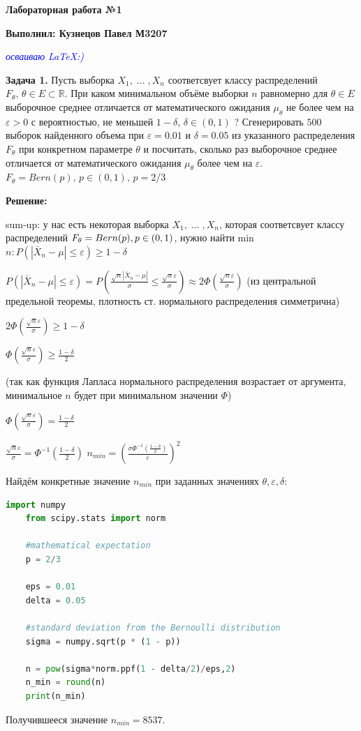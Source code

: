 \documentclass{article}
\begin{document}
\Large\textbf{Лабораторная работа №1}

\textbf{Выполнил: Кузнецов Павел М3207}

\textcolor{blue}{\textit{осваиваю \LaTeX:)}}
\vspace{5mm}

\textbf{Задача 1.} Пусть выборка $X_1,\; \ldots\;, X_n$ соответсвует классу распределений $F_\theta,\,\theta\in E\subset \mathbb{R}$. При каком минимальном объёме выборки $n$ равномерно для $\theta \in E$ выборочное среднее отличается от математического ожидания $\mu_\theta$ не более чем на $\varepsilon>0$ с вероятностью, не меньшей $1 - \delta,\,\delta \in (0,1)$ ? Сгенерировать $500$ выборок найденного объема при $\varepsilon=0.01$ и $\delta=0.05$ из указанного распределения $F_\theta$ при конкретном параметре $\theta$ и посчитать, сколько раз выборочное среднее отличается от математического ожидания $\mu_\theta$ более чем на $\varepsilon$.\\$F_\theta = Bern(p),\,p \in (0,1),\,p=2/3$
\vspace{5mm}

\textbf{Решение:}

    sum-up: у нас есть некоторая выборка $X_1,\; \ldots\;, X_n$, 
    которая соответсвует классу распределений $F_\theta = Bern(p),\\p \in (0,1)$, нужно найти min $n : P(|\bar X_n - \mu| \leq \varepsilon) \geq 1 - \delta$
\begin {center}
$P(|\bar X_n - \mu| \leq \varepsilon) = P(\frac{\sqrt{n}|\bar X_n - \mu|}{\sigma} \leq \frac{\sqrt{n}\varepsilon}{\sigma}) \approx 2\Phi(\frac{\sqrt{n}\varepsilon}{\sigma})$ (из центральной предельной теоремы, плотность ст. нормального распределения симметрична)

$2\Phi(\frac{\sqrt{n}\varepsilon}{\sigma}) \geq 1 - \delta$

$\Phi(\frac{\sqrt{n}\varepsilon}{\sigma}) \geq \frac{1 - \delta}{2}$

(так как функция Лапласа нормального распределения возрастает от аргумента, минимальное $n$ будет при минимальном значении $\Phi$)

$\Phi(\frac{\sqrt{n}\varepsilon}{\sigma}) = \frac{1 -\delta}{2}$

$\frac{\sqrt{n}\varepsilon}{\sigma} = \Phi^{-1}(\frac{1 - \delta}{2})$
\newpage
$n_{min} = (\frac{\sigma\Phi^{-1}(\frac{1 - \delta}{2})}{\varepsilon})^2$
\end{center}
Найдём конкретные значение $n_{min}$ при заданных значениях $\theta, \varepsilon, \delta$:
\begin{lstlisting}[language=Python, mathescape=true, breaklines=true]
    import numpy
    from scipy.stats import norm
    
    #mathematical expectation
    p = 2/3

    eps = 0.01
    delta = 0.05

    #standard deviation from the Bernoulli distribution
    sigma = numpy.sqrt(p * (1 - p))
    
    n = pow(sigma*norm.ppf(1 - delta/2)/eps,2)
    n_min = round(n)
    print(n_min)
\end{lstlisting}
Получившееся значение $n_{min} = 8537$.
\end{document}
